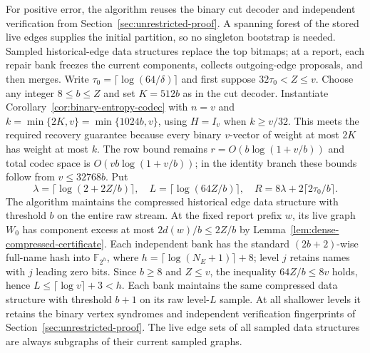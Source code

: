 \documentclass[11pt,letterpaper]{article}
\numberwithin{equation}{section}
\begin{document}
For positive error, the algorithm reuses the binary cut decoder and independent verification from Section~\ref{sec:unrestricted-proof}.
A spanning forest of the stored live edges supplies the initial partition, so no singleton bootstrap is needed.
Sampled historical-edge data structures replace the top bitmaps; at a report, each repair bank freezes the current components, collects outgoing-edge proposals, and then merges.
Write $\tau_0=\lceil\log(64/\delta)\rceil$ and first suppose $32\tau_0<Z\le v$.
Choose any integer $8\le b\le Z$ and set $K=512b$ as in the cut decoder.
Instantiate Corollary~\ref{cor:binary-entropy-codec} with $n=v$ and $k=\min\{2K,v\}=\min\{1024b,v\}$, using $H=I_v$ when $k\ge v/32$.
This meets the required recovery guarantee because every binary $v$-vector of weight at most $2K$ has weight at most $k$.
The row bound remains $r=O(b\log(1+v/b))$ and total codec space is $O(vb\log(1+v/b))$; in the identity branch these bounds follow from $v\le32768b$.
Put
\begin{equation}
\lambda=\lceil\log(2+2Z/b)\rceil,\quad
 L=\lceil\log(64Z/b)\rceil,\quad
 R=8\lambda+2\lceil2\tau_0/b\rceil.                        \label{eq:forest-df8}
\end{equation}
The algorithm maintains the compressed historical edge data structure with threshold $b$ on the entire raw stream.
At the fixed report prefix $w$, its live graph $W_0$ has component excess at most $2d(w)/b\le2Z/b$ by Lemma~\ref{lem:dense-compressed-certificate}.
Each independent bank has the standard $(2b+2)$-wise full-name hash into $\mathbb F_{2^h}$, where $h=\lceil\log(N_E+1)\rceil+8$; level $j$ retains names with $j$ leading zero bits.
Since $b\ge8$ and $Z\le v$, the inequality $64Z/b\le8v$ holds, hence $L\le\lceil\log v\rceil+3<h$.
Each bank maintains the same compressed data structure with threshold $b+1$ on its raw level-$L$ sample.
At all shallower levels it retains the binary vertex syndromes and independent verification fingerprints of Section~\ref{sec:unrestricted-proof}.
The live edge sets of all sampled data structures are always subgraphs of their current sampled graphs.
\end{document}
